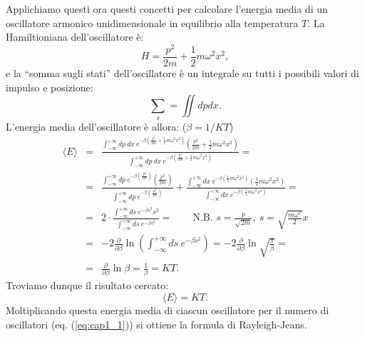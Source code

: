 \documentclass[a4paper,12pt,oneside]{book}
\begin{document}
Applichiamo questi ora questi concetti per calcolare l'energia media di un oscillatore armonico unidimensionale in equilibrio alla temperatura $T$. La Hamiltioniana dell'oscillatore è:
	\begin{equation}
		H= \frac{p^2}{2m}+\frac{1}{2}m \omega ^2 x^2 , 
	\end{equation}
e la ``somma sugli stati'' dell'oscillatore è un integrale su tutti i possibili valori di impulso e posizione:
	\begin{equation}
		\sum _s = \iint dp dx .
	\end{equation}
L'energia media dell'oscillatore è allora: ($\beta = 1/KT$)
	\begin{eqnarray}
		\langle E \rangle &=& \frac{\int _{-\infty} ^{+\infty} dp\ dx \ e^{-\beta \left( \frac{p^2}{2m}+\frac{1}{2}m \omega ^2x^2\right)}\left( \frac{p^2}{2m}+\frac{1}{2}m \omega ^2x^2\right)}{\int _{-\infty} ^{+\infty} dp\ dx\ e^{-\beta \left( \frac{p^2}{2m}+\frac{1}{2}m \omega ^2x^2\right)}}= \nonumber \\
		&=&\frac{\int _{-\infty} ^{+\infty} dp \ e^{-\beta \left( \frac{p^2}{2m}\right)}\left( \frac{p^2}{2m}\right)}{\int _{-\infty} ^{+\infty} dp \  e^{-\beta \left( \frac{p^2}{2m}\right)}} + \frac{\int _{-\infty} ^{+\infty}  dx \  e^{-\beta \left(\frac{1}{2}m \omega ^2x^2\right)}\left(\frac{1}{2}m \omega ^2x^2\right)}{\int _{-\infty} ^{+\infty} dx\ e^{-\beta \left( \frac{1}{2}m \omega ^2x^2\right)}}= \nonumber \\
		&=& 2\cdot \frac{\int _{-\infty} ^{+\infty}ds \  e^{-\beta s^2}s^2}{\int _{-\infty} ^{+\infty}ds \  e^{-\beta s^2}}= \qquad \scriptstyle{\textrm{N.B. } s=\frac{p}{\sqrt{2m}}, \ s= \sqrt{\frac{m \omega ^2}{2}}x}\nonumber \\
		&=&-2 \frac{\partial}{\partial \beta} \ln \left(\int _{-\infty} ^{+\infty}ds \  e^{-\beta s^2} \right) = -2\frac{\partial}{\partial \beta} \ln \sqrt{\frac{\pi}{\beta}}= \nonumber \\
	&=& \frac{\partial}{\partial \beta} \ln \beta = \frac{1}{\beta}= KT. 
	\end{eqnarray}
Troviamo dunque il risultato cercato:
	\begin{equation}
	\boxed{
			\langle E \rangle = KT.
	}
	\label{eq:cap1_2}
\end{equation}
Moltiplicando questa energia media di ciascun oscillatore per il numero di oscillatori (eq. (\ref{eq:cap1_1})) si ottiene la formula di Rayleigh-Jeans.\\
\end{document}
